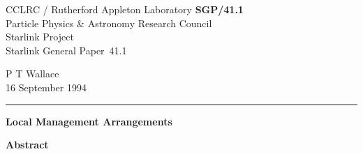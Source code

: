 \documentclass[twoside,11pt]{article}
\newcommand{\stardoccategory}  {Starlink General Paper}
\newcommand{\stardocinitials}  {SGP}
\newcommand{\stardocnumber}    {41.1}
\newcommand{\stardocauthors}   {P T Wallace}
\newcommand{\stardocdate}      {16 September 1994}
\newcommand{\stardoctitle}     {Local Management Arrangements}
\newcommand{\stardocname}{\stardocinitials /\stardocnumber}
\newenvironment{latexonly}{}{}
\begin{document}
\thispagestyle{empty}

\begin{latexonly}
   CCLRC / {\sc Rutherford Appleton Laboratory} \hfill {\bf \stardocname}\\
   {\large Particle Physics \& Astronomy Research Council}\\
   {\large Starlink Project\\}
   {\large \stardoccategory\ \stardocnumber}
   \begin{flushright}
   \stardocauthors\\
   \stardocdate
   \end{flushright}
   \vspace{-4mm}
   \rule{\textwidth}{0.5mm}
   \vspace{5mm}
   \begin{center}
   {\Large\bf \stardoctitle}
   \end{center}
   \vspace{5mm}

   \vspace{10mm}
   \begin{center}
      {\Large\bf Abstract}
   \end{center}
\end{latexonly}
\end{document}
